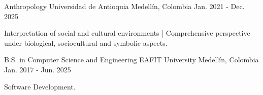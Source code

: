 

\begin{cventries}

  \cventry
    {Anthropology} %
    {Universidad de Antioquia} %
    {Medellín, Colombia} %
    {Jan. 2021 - Dec. 2025} %
    {
      \begin{cvitems} %
        \item {Interpretation of social and cultural environments | Comprehensive perspective under biological, sociocultural and symbolic aspects.}
      \end{cvitems}
    }
  \cventry
    {B.S. in Computer Science and Engineering} %
    {EAFIT University} %
    {Medellín, Colombia} %
    {Jan. 2017 - Jun. 2025} %
    {
      \begin{cvitems} %
        \item {Software Development.}
      \end{cvitems}
    }
\end{cventries}